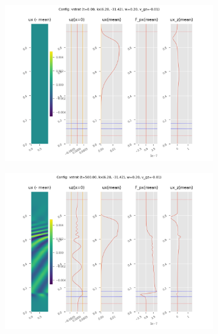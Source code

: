 \documentclass[dvipsnames, 10pt]{beamer}
\begin{document}
\begin{frame}
    \begin{figure}[t]
        \centering
        \hspace*{-19mm}%
        \begin{subfigure}{0.55\textwidth}
            \centering
            \includegraphics[width=\textwidth]{vstrat_0.png}
        \end{subfigure}
        \begin{subfigure}{0.55\textwidth}
            \centering
            \includegraphics[width=\textwidth]{vstrat_1.png}
        \end{subfigure}
        \hspace*{-19mm}%
    \end{figure}
\end{frame}
\end{document}
